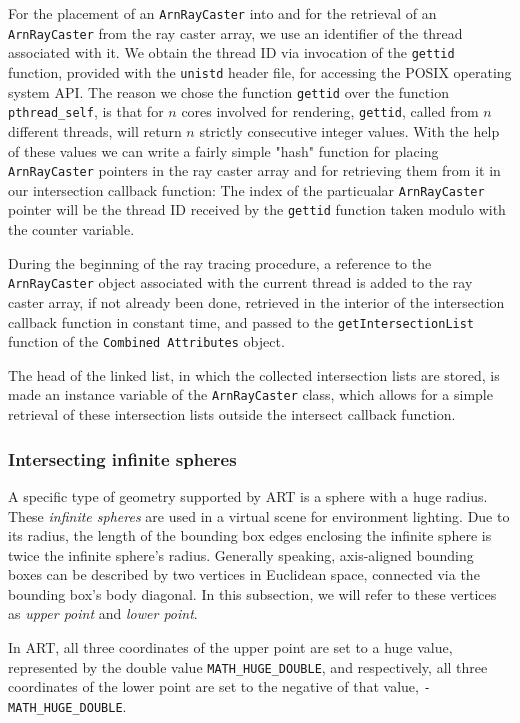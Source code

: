 For the placement of an \texttt{ArnRayCaster} into and for the retrieval of an \texttt{ArnRayCaster} from the ray caster array, we use an identifier of the thread associated with it. We obtain the thread ID via invocation of the \texttt{gettid} function, provided with the \texttt{unistd} header file, for accessing the POSIX operating system API. The reason we chose the function \texttt{gettid} over the function \texttt{pthread\_self}, is that for $n$ cores involved for rendering, \texttt{gettid}, called from $n$ different threads, will return $n$ strictly consecutive integer values. With the help of these values we can write a fairly simple "hash" function for placing \texttt{ArnRayCaster} pointers in the ray caster array and for retrieving them from it in our intersection callback function: The index of the particualar \texttt{ArnRayCaster} pointer will be the thread ID received by the \texttt{gettid} function taken modulo with the counter variable.

During the beginning of the ray tracing procedure, a reference to the  \texttt{ArnRayCaster} object associated with the current thread is added to the ray caster array, if not already been done, retrieved in the interior of the intersection callback function in constant time, and passed to the \texttt{getIntersectionList} function of the \texttt{Combined Attributes} object. 

The head of the linked list, in which the collected intersection lists are stored, is made an instance variable of the \texttt{ArnRayCaster} class, which allows for a simple retrieval of these intersection lists outside the intersect callback function. 

\subsubsection{Intersecting infinite spheres}

A specific type of geometry supported by ART is a sphere with a huge radius. These \emph{infinite spheres} are used in a virtual scene for environment lighting.
Due to its radius, the length of the bounding box edges enclosing the infinite sphere is twice the infinite sphere's radius. 
Generally speaking, axis-aligned bounding boxes can be described by two vertices in Euclidean space, connected via the bounding box's body diagonal. In this subsection, we will refer to these vertices as \emph{upper point} and \emph{lower point}. 

In ART, all three coordinates of the upper point are set to a huge value, represented by the double value \texttt{MATH\_HUGE\_DOUBLE}, and respectively, all three coordinates of the lower point are set to the negative of that value, \texttt{- MATH\_HUGE\_DOUBLE}.

